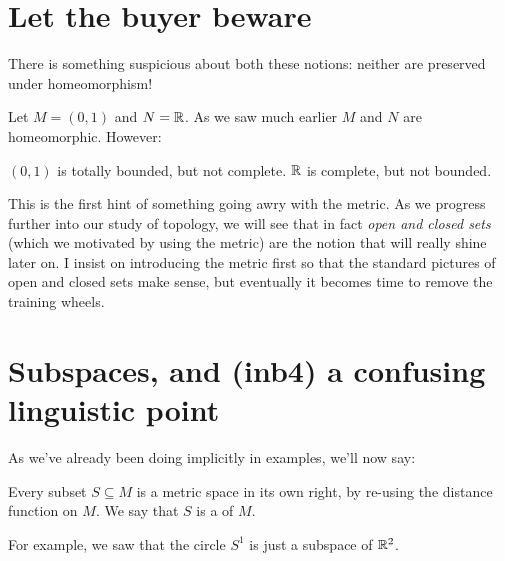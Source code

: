 \section{Let the buyer beware}
There is something suspicious about both these notions:
neither are preserved under homeomorphism!

\begin{example}
	\label{ex:fishy}
	Let $M = (0,1)$ and $N = \mathbb R$.
	As we saw much earlier $M$ and $N$ are homeomorphic.
	However:
	\begin{itemize}
		\ii $(0,1)$ is totally bounded, but not complete.
		\ii $\mathbb R$ is complete, but not bounded.
	\end{itemize}
\end{example}

This is the first hint of something going awry with the metric.
As we progress further into our study of topology,
we will see that in fact \emph{open and closed sets}
(which we motivated by using the metric)
are the notion that will really shine later on.
I insist on introducing the metric first so that
the standard pictures of open and closed sets make sense,
but eventually it becomes time to remove the training wheels.



\section{Subspaces, and (inb4) a confusing linguistic point}

As we've already been doing implicitly in examples, we'll now say:
\begin{definition}
	Every subset $S \subseteq M$ is a metric space in its own right,
	by re-using the distance function on $M$.
	We say that $S$ is a  of $M$.
\end{definition}
For example, we saw that the circle $S^1$
is just a subspace of $\mathbb R^2$.

